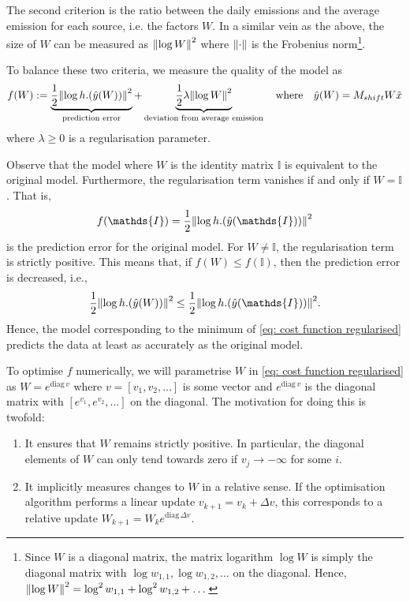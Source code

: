 \documentclass{article}
\begin{document}
The second criterion is the ratio between the daily emissions and the average emission for each source, i.e. the factors $W$. In a similar vein as the above, the size of $W$ can be measured as $\norm{\log W}^2$ where $\norm{\cdot}$ is the Frobenius norm\footnote{Since $W$ is a diagonal matrix, the matrix logarithm $\log W$ is simply the diagonal matrix with $\log w_{1,1}, \log w_{1,2}, \dots$ on the diagonal. Hence, $\norm{\log W}^2 = \log^2 w_{1,1} + \log^2 w_{1,2} + \dots$}. 

To balance these two criteria, we measure the quality of the model as 
\begin{equation}
    \label{eq: cost function regularised}
f(W) := 
\underbrace{\frac{1}{2}\norm{\log h.(\hat{y}(W))}^2}_{\text{prediction error}} + \underbrace{\frac{1}{2}\lambda \norm{\log W}^2}_{\text{deviation from average emission}}
\quad\text{where}\quad 
\hat{y}(W) = M_{shift} W \tilde{x}
\end{equation}
where $\lambda \ge 0$ is a regularisation parameter.

Observe that the model where $W$ is the identity matrix $\mathds{I}$ is equivalent to the original model. Furthermore, the regularisation term vanishes if and only if $W = \mathds{I}$. That is,
$$
f(\mathds{I}) = \frac{1}{2}\norm{\log h.(\hat{y}(\mathds{I}))}^2
$$
is the prediction error for the original model.
For $W \ne \mathds{I}$, the regularisation term is strictly positive. This means that, if $f(W) \le f(\mathds{I})$, then the prediction error is decreased, i.e.,
$$
\frac{1}{2}\norm{\log h.(\hat{y}(W))}^2
\le
\frac{1}{2}\norm{\log h.(\hat{y}(\mathds{I}))}^2
.$$
Hence, the model corresponding to the minimum of \cref{eq: cost function regularised} predicts the data at least as accurately as the original model.

To optimise $f$ numerically, we will parametrise $W$ in \cref{eq: cost function regularised} as $W = e^{\mathrm{diag}\, v}$ where $v = [v_1, v_2,\dots]$ is some vector and $e^{\mathrm{diag}\, v}$ is the diagonal matrix with $[e^{v_1}, e^{v_2},\dots]$ on the diagonal. The motivation for doing this is twofold:
\begin{enumerate}
    \item It ensures that $W$ remains strictly positive. In particular, the diagonal elements of $W$ can only tend towards zero if $v_j \rightarrow -\infty$ for some $i$. 
    \item It implicitly measures changes to $W$ in a relative sense. If the optimisation algorithm performs a linear update $v_{k+1} = v_k + \Delta v$, this corresponds to a relative update $W_{k+1} = W_k e^{\mathrm{diag}\, \Delta v}$.
\end{enumerate}
\end{document}
